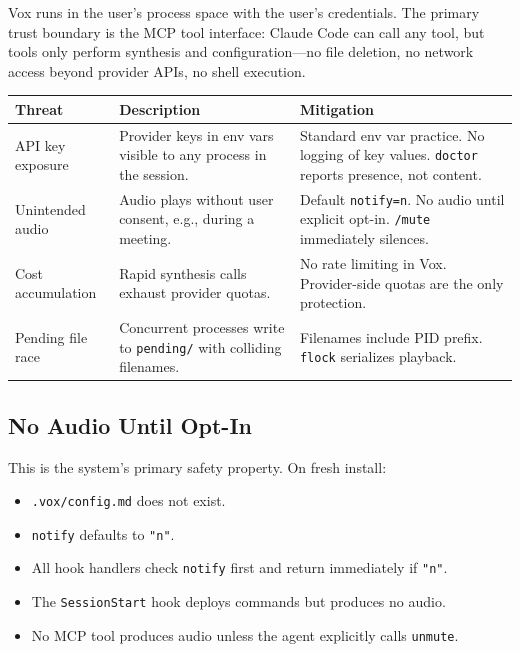 \documentclass[a4paper,10pt]{article}
\newcommand{\tool}[1]{\texttt{#1}}
\newcommand{\field}[1]{\texttt{#1}}
\newcommand{\hook}[1]{\texttt{#1}}
\newcommand{\cmd}[1]{\texttt{/#1}}
\begin{document}
Vox runs in the user's process space with the user's credentials.
The primary trust boundary is the MCP tool interface: Claude Code
can call any tool, but tools only perform synthesis and
configuration---no file deletion, no network access beyond
provider APIs, no shell execution.

\begin{center}
\begin{tabular}{lp{5.5cm}p{4cm}}
\toprule
\textbf{Threat} & \textbf{Description} & \textbf{Mitigation} \\
\midrule
API key exposure & Provider keys in env vars visible to any
  process in the session. & Standard env var practice.  No
  logging of key values.  \texttt{doctor} reports presence, not
  content. \\
Unintended audio & Audio plays without user consent, e.g.,
  during a meeting. & Default \field{notify=n}.  No audio until
  explicit opt-in.  \cmd{mute} immediately silences. \\
Cost accumulation & Rapid synthesis calls exhaust provider
  quotas. & No rate limiting in Vox.  Provider-side quotas are
  the only protection. \\
Pending file race & Concurrent processes write to
  \texttt{pending/} with colliding filenames. & Filenames include
  PID prefix.  \texttt{flock} serializes playback. \\
\bottomrule
\end{tabular}
\end{center}

\subsection{No Audio Until Opt-In}

This is the system's primary safety property.  On fresh install:

\begin{itemize}
  \item \texttt{.vox/config.md} does not exist.
  \item \field{notify} defaults to \texttt{"n"}.
  \item All hook handlers check \field{notify} first and return
    immediately if \texttt{"n"}.
  \item The \hook{SessionStart} hook deploys commands but
    produces no audio.
  \item No MCP tool produces audio unless the agent explicitly
    calls \tool{unmute}.
\end{itemize}
\end{document}
